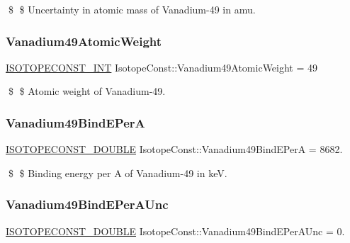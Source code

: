 \$ \$ Uncertainty in atomic mass of Vanadium-\/49 in amu. \mbox{\label{group___isotope_const-_vanadium-_v49_ga69e71744af1a053e5bafa800c4bf8d5d}} 
\subsubsection{\texorpdfstring{Vanadium49\+Atomic\+Weight}{Vanadium49AtomicWeight}}
{\footnotesize\ttfamily \mbox{\hyperlink{group___isotope_const-_macros_ga5f18360b3e99483a35c32d789e62621c}{I\+S\+O\+T\+O\+P\+E\+C\+O\+N\+S\+T\+\_\+\+I\+NT}} Isotope\+Const\+::\+Vanadium49\+Atomic\+Weight = 49}

\$ \$ Atomic weight of Vanadium-\/49. \mbox{\label{group___isotope_const-_vanadium-_v49_gacd60db89469aa636bceae95f3a3b2e08}} 
\subsubsection{\texorpdfstring{Vanadium49\+Bind\+E\+PerA}{Vanadium49BindEPerA}}
{\footnotesize\ttfamily \mbox{\hyperlink{group___isotope_const-_macros_ga8f45a7272ce02c0b4c65c44636ed719a}{I\+S\+O\+T\+O\+P\+E\+C\+O\+N\+S\+T\+\_\+\+D\+O\+U\+B\+LE}} Isotope\+Const\+::\+Vanadium49\+Bind\+E\+PerA = 8682.}

\$ \$ Binding energy per A of Vanadium-\/49 in keV. \mbox{\label{group___isotope_const-_vanadium-_v49_ga7684cedaf4d6827c59a5901eecb0969c}} 
\subsubsection{\texorpdfstring{Vanadium49\+Bind\+E\+Per\+A\+Unc}{Vanadium49BindEPerAUnc}}
{\footnotesize\ttfamily \mbox{\hyperlink{group___isotope_const-_macros_ga8f45a7272ce02c0b4c65c44636ed719a}{I\+S\+O\+T\+O\+P\+E\+C\+O\+N\+S\+T\+\_\+\+D\+O\+U\+B\+LE}} Isotope\+Const\+::\+Vanadium49\+Bind\+E\+Per\+A\+Unc = 0.}

